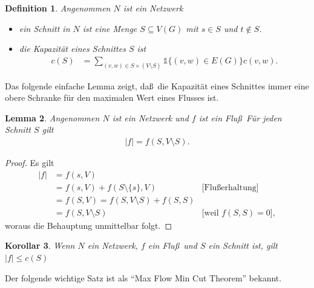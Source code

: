 \documentclass[10pt,reqno]{amsart}
\numberwithin{equation}{section}
\newcommand\alert[1]{\emph{#1}}
\newtheorem{definition}{Definition}[section]
\newtheorem{lemma}[definition]{Lemma}
\newtheorem{corollary}[definition]{Korollar}
\newcommand{\vecone}{\mathbb{1}}
\begin{document}
\begin{definition}\label{def_cut}
	Angenommen $N$ ist ein Netzwerk
	\begin{itemize}
		\item ein \alert{Schnitt} in $N$ ist eine Menge $S\subseteq V(G)$ mit $s\in S$ und $t\not\in S$.
		\item die \alert{Kapazit\"at} eines Schnittes $S$ ist
			\begin{align*}
				c(S)&=\sum_{(v,w)\in S\times (V\setminus S)}\vecone\{(v,w)\in E(G)\}c(v,w).
			\end{align*}
	\end{itemize}
\end{definition}

Das folgende einfache Lemma zeigt, da\ss\ die Kapazit\"at eines Schnittes immer eine obere Schranke f\"ur den maximalen Wert eines Flusses ist.

\begin{lemma}\label{lem_cut}
	Angenommen $N$ ist ein Netzwerk und $f$ ist ein Flu\ss\
	F\"ur jeden Schnitt $S$ gilt
	\begin{align*}
		|f|=f(S,V\setminus S).
	\end{align*}
\end{lemma}
\begin{proof}
	Es gilt
	\begin{align*}
		|f|&=f(s,V)\\
		   &=f(s,V)+f(S\setminus\{s\},V)&\mbox{[Flu\ss erhaltung]}\\
		   &=f(S,V)=f(S,V\setminus S)+f(S,S)\\
		   &=f(S,V\setminus S)&\mbox{[weil $f(S,S)=0$]},
	\end{align*}
	woraus die Behauptung unmittelbar folgt.
\end{proof}

\begin{corollary}\label{cor_cut}
	Wenn $N$ ein Netzwerk, $f$ ein Flu\ss\ und $S$ ein Schnitt ist, gilt $|f|\leq c(S)$
\end{corollary}

Der folgende wichtige Satz ist als ``Max Flow Min Cut Theorem'' bekannt.
\end{document}

